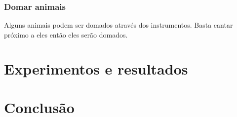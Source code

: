 \documentclass[12pt, 
openright, 
oneside, 
a4paper,    
brazil]{facom-ufu-abntex2}
\begin{document}
\subsection{Domar animais}
Alguns animais podem ser domados através dos instrumentos. Basta cantar próximo a eles então eles serão domados.

\chapter{Experimentos e resultados}
\label{sec:experim}









\chapter{Conclusão}
\label{sec:conclus}









\postextual








\end{document}
